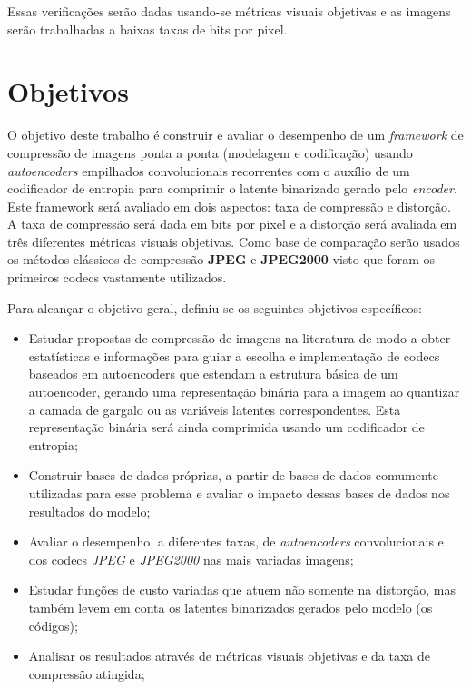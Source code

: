 Essas verificações serão dadas usando-se métricas visuais objetivas e as imagens serão trabalhadas a baixas taxas de bits por pixel.
\section{Objetivos}
\label{sec:objetivos}
O objetivo deste trabalho é construir e avaliar o desempenho de um \textit{framework} de compressão de imagens ponta a ponta (modelagem e codificação) usando \textit{autoencoders} empilhados convolucionais recorrentes com o auxílio de um codificador de entropia para comprimir o latente binarizado gerado pelo \textit{encoder}. Este framework será avaliado em dois aspectos: taxa de compressão e distorção. A taxa de compressão será dada em bits por pixel e a distorção será avaliada em três diferentes métricas visuais objetivas. Como base de comparação serão usados os métodos clássicos de compressão \textbf{JPEG} e \textbf{JPEG2000} visto que foram os primeiros codecs vastamente utilizados.

Para alcançar o objetivo geral, definiu-se os seguintes objetivos específicos:
\begin{itemize}
    \item Estudar propostas de compressão de imagens na literatura de modo a obter estatísticas e informações para guiar a escolha e implementação de codecs baseados em autoencoders que estendam a estrutura básica de um autoencoder, gerando uma representação binária para a imagem ao quantizar a camada de gargalo ou as variáveis latentes correspondentes. Esta representação binária será ainda comprimida usando um codificador de entropia;
    \item Construir bases de dados próprias, a partir de bases de dados comumente utilizadas para esse problema e avaliar o impacto dessas bases de dados nos resultados do modelo;
    \item Avaliar o desempenho, a diferentes taxas, de \textit{autoencoders} convolucionais e dos codecs \textit{JPEG} e \textit{JPEG2000} nas mais variadas imagens;
    \item Estudar funções de custo variadas que atuem não somente na distorção, mas também levem em conta os latentes binarizados gerados pelo modelo (os códigos); 
    \item Analisar os resultados através de métricas visuais objetivas e da taxa de compressão atingida;
\end{itemize}


